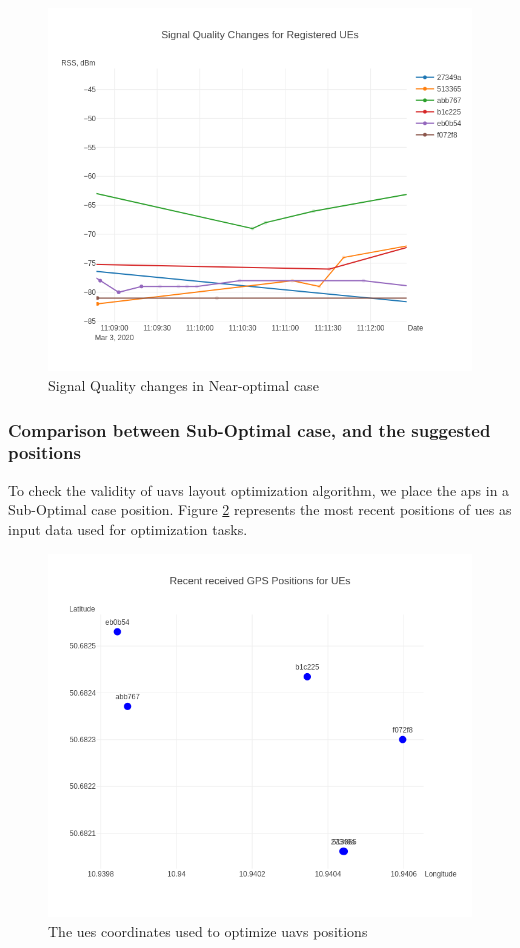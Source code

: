 \begin{figure}[H]
	\centering
	\includegraphics[width=0.7\linewidth,keepaspectratio]{images/Exp4_Near_Optimal.png}
\caption{Signal Quality changes in Near-optimal case}
\label{fig:signal-quality-changes-near-optimal}
\end{figure}

\subsubsection{Comparison between Sub-Optimal case, and the suggested
positions}

To check the validity of \glspl{uav} layout optimization algorithm, we place the \glspl{ap} in a Sub-Optimal case position. Figure \ref{fig:ues-positions-for-optimization} represents the most recent positions  of \glspl{ue} as input data used for optimization tasks.

\begin{figure}[H]
	\centering
	\includegraphics[width=0.5\linewidth,keepaspectratio]{images/Exp4_UEs_Location_to_optimize.png}
\caption{The \glspl{ue} coordinates used to optimize \glspl{uav} positions}
\label{fig:ues-positions-for-optimization}
\end{figure}

